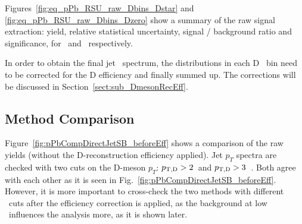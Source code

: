 Figures~\ref{fig:eq_pPb_RSU_raw_Dbins_Dstar} and \ref{fig:eq_pPb_RSU_raw_Dbins_Dzero} show a summary of the raw signal extraction:
yield, relative statistical uncertainty, signal / background ratio and significance, for \Dstar\ and \Dzero\ respectively.
%
%

In order to obtain the final jet \pt\ spectrum, the distributions in each D \pt\ bin need to be corrected for the D efficiency and finally summed up.
The corrections will be discussed in Section~\ref{sect:sub_DmesonRecEff}. 
\subsection{Method Comparison}

Figure~\ref{fig:pPbCompDirectJetSB_beforeEff} shows a comparison of the raw yields (without the D-reconstruction efficiency applied). 
Jet $p_T$ spectra are checked with two cuts on the D-meson $p_{T}$: $p_{\mathrm{T,D}}>2$~\GeVc and $p_{\mathrm{T,D}}>3$~\GeVc. Both agree with each other as it is seen in Fig.~\ref{fig:pPbCompDirectJetSB_beforeEff}. 
However, it is more important to cross-check the two methods with different \ptd\ cuts after the efficiency correction is applied, 
as the background at low \ptd\ influences the analysis more, as it is shown later.

